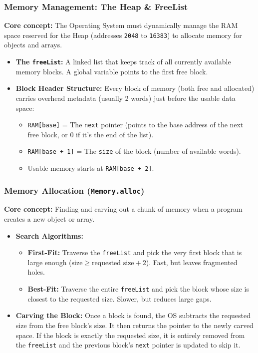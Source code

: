 \documentclass[12pt,a4paper]{article}
\begin{document}
\subsubsection*{Memory Management: The Heap \& FreeList}
\textbf{Core concept:} The Operating System must dynamically manage the RAM space reserved for the Heap (addresses \texttt{2048} to \texttt{16383}) to allocate memory for objects and arrays.
\begin{itemize}
    \item \textbf{The \texttt{freeList}:} A linked list that keeps track of all currently available memory blocks. A global variable points to the first free block.
    \item \textbf{Block Header Structure:} Every block of memory (both free and allocated) carries overhead metadata (usually 2 words) just before the usable data space:
    \begin{itemize}
        \item \texttt{RAM[base]} = The \texttt{next} pointer (points to the base address of the next free block, or $0$ if it's the end of the list).
        \item \texttt{RAM[base + 1]} = The \texttt{size} of the block (number of available words).
        \item Usable memory starts at \texttt{RAM[base + 2]}.
    \end{itemize}
\end{itemize}

\subsubsection*{Memory Allocation (\texttt{Memory.alloc})}
\textbf{Core concept:} Finding and carving out a chunk of memory when a program creates a new object or array.
\begin{itemize}
    \item \textbf{Search Algorithms:}
    \begin{itemize}
        \item \textbf{First-Fit:} Traverse the \texttt{freeList} and pick the very first block that is large enough ($\text{size} \geq \text{requested size} + 2$). Fast, but leaves fragmented holes.
        \item \textbf{Best-Fit:} Traverse the entire \texttt{freeList} and pick the block whose size is closest to the requested size. Slower, but reduces large gaps.
    \end{itemize}
    \item \textbf{Carving the Block:} Once a block is found, the OS subtracts the requested size from the free block's size. It then returns the pointer to the newly carved space. If the block is exactly the requested size, it is entirely removed from the \texttt{freeList} and the previous block's \texttt{next} pointer is updated to skip it.
\end{itemize}
\end{document}
